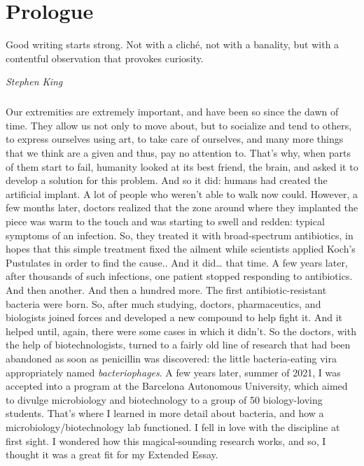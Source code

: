 \chapter{Prologue}
\epigraph{Good writing starts strong. Not with a cliché, not with a banality, but with a contentful observation that provokes curiosity.}{\textit{Stephen King}}
\paragraph{}Our extremities are extremely important, and have been so since the dawn of time. They allow us not only to move about, but to socialize and tend to others, to express ourselves using art, to take care of ourselves, and many more things that we think are a given and thus, pay no attention to. That's why, when parts  of them start to fail, humanity looked at its best friend, the brain, and asked it to develop a solution for this problem. And so it did: humans had created the artificial implant. A lot of people who weren't able to walk now could. However, a few months later, doctors realized that the zone around where they implanted the piece was warm to the touch and was starting to swell and redden: typical symptoms of an infection. So, they treated it with broad-spectrum antibiotics, in hopes that this simple treatment fixed the ailment while scientists applied Koch's Pustulates in order to find the cause.. And it did… that time. A few years later, after thousands of such infections, one patient stopped responding to antibiotics. And then another. And then a hundred more. The first antibiotic-resistant bacteria were born. So, after much studying, doctors, pharmaceutics, and biologists joined forces and developed a new compound to help fight it. And it helped until, again, there were some cases in which it didn't. So the doctors, with the help of biotechnologists, turned to a fairly old line of research that had been abandoned as soon as penicillin was discovered: the little bacteria-eating vira appropriately named \emph{bacteriophages}.\newline
A few years later, summer of 2021, I was accepted into a program at the Barcelona Autonomous University, which aimed to divulge microbiology and biotechnology to a group of 50 biology-loving students. That's where I learned in more detail about bacteria, and how a microbiology/biotechnology lab functioned. I fell in love with the discipline at first sight. I wondered how this magical-sounding research works, and so, I thought it was a great fit for my Extended Essay.


